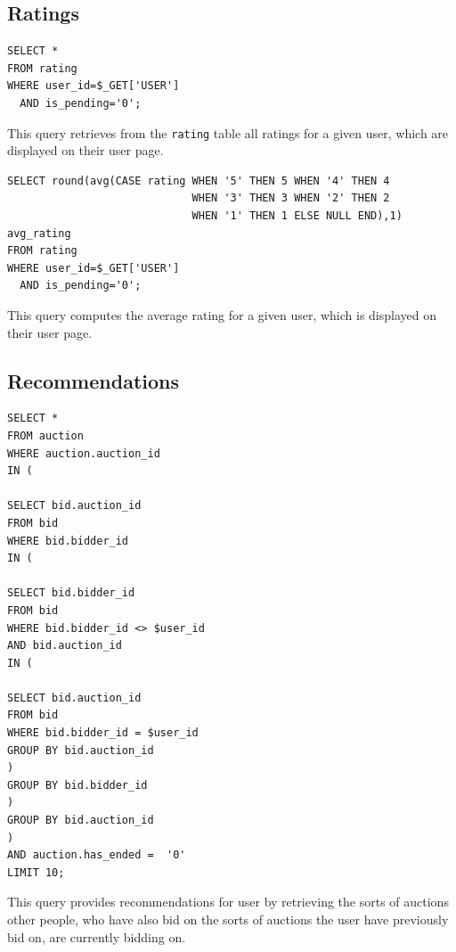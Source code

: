 \documentclass{article}
\begin{document}
\subsection{Ratings}
\begin{verbatim}
SELECT *
FROM rating
WHERE user_id=$_GET['USER']
  AND is_pending='0';
\end{verbatim}
This query retrieves from the \texttt{rating} table all ratings for a given user, which are displayed on their user page.

\begin{verbatim}
SELECT round(avg(CASE rating WHEN '5' THEN 5 WHEN '4' THEN 4 
                             WHEN '3' THEN 3 WHEN '2' THEN 2 
                             WHEN '1' THEN 1 ELSE NULL END),1) avg_rating
FROM rating
WHERE user_id=$_GET['USER']
  AND is_pending='0';
\end{verbatim}
This query computes the average rating for a given user, which is displayed on their user page.

\subsection{Recommendations}
\begin{verbatim}
SELECT * 
FROM auction
WHERE auction.auction_id
IN (

SELECT bid.auction_id
FROM bid
WHERE bid.bidder_id
IN (

SELECT bid.bidder_id
FROM bid
WHERE bid.bidder_id <> $user_id 
AND bid.auction_id
IN (

SELECT bid.auction_id
FROM bid
WHERE bid.bidder_id = $user_id
GROUP BY bid.auction_id
)
GROUP BY bid.bidder_id
)
GROUP BY bid.auction_id
)
AND auction.has_ended =  '0'
LIMIT 10;
\end{verbatim}
This query provides recommendations for user by retrieving the sorts of auctions other people, who have also bid on the sorts of auctions the user have previously bid on, are currently bidding on.
\end{document}
